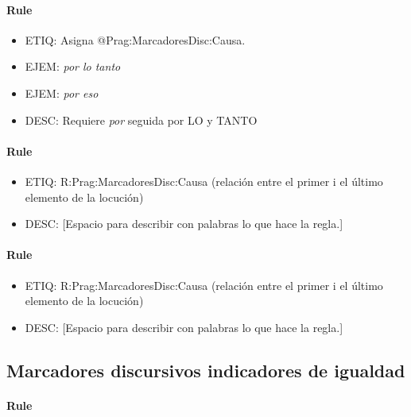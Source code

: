 \documentclass[11pt]{report}
\begin{document}
\paragraph*{Rule}
\begin{itemize}
\item ETIQ: Asigna @Prag:MarcadoresDisc:Causa.
\item EJEM: \emph{por lo tanto}
\item EJEM: \emph{por eso}
\item DESC: Requiere \emph{por} seguida por LO y TANTO
\end{itemize}

\paragraph*{Rule}
\begin{itemize}
\item ETIQ: R:Prag:MarcadoresDisc:Causa (relación entre el primer i el último elemento de la locución)
\item DESC: [Espacio para describir con palabras lo que hace la regla.]
\end{itemize}

\paragraph*{Rule}
\begin{itemize}
\item ETIQ: R:Prag:MarcadoresDisc:Causa (relación entre el primer i el último elemento de la locución)
\item DESC: [Espacio para describir con palabras lo que hace la regla.]
\end{itemize}

\subsection{Marcadores discursivos indicadores de igualdad}
\paragraph*{Rule}
\end{document}
